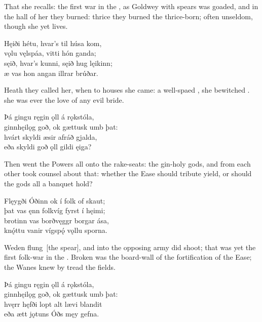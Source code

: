 \bvb That she recalls: the first war in the , as Goldwey with spears was goaded, and in the hall of \footnotemark[1] her they burned: thrice they burned the thrice-born; often unseldom, though she yet lives.\footnotemark[2]\evb
{}

\bva Hęiði hétu, \hld hvar’s til húsa kom, \\%
vǫlu vęlspáa, \hld vitti hón ganda; \\%
sęið, hvar’s kunni, \hld sęið hug lęikinn; \\%
æ vas hon angan \hld illrar brúðar.\eva

\bvb Heath they called her, when to houses she came: a well-spaed , she bewitched . she was ever the love of any evil bride.\evb

\bva Þá gingu ręgin ǫll \hld á rǫkstóla, \\%
ginnhęilǫg goð, \hld ok gættusk umb þat: \\%
hvárt skyldi æsir \hld afráð gjalda, \\%
eða skyldi goð ǫll \hld gildi ęiga?\eva

\bvb Then went the Powers all onto the rake-seats: the gin-holy gods, and from each other took counsel about that: whether the Ease should tribute yield, or should the gods all a banquet hold?\evb

\bva Flęygði Óðinn \hld ok í folk of skaut; \\%
þat vas ęnn folkvíg \hld fyrst í hęimi; \\%
brotinn vas borðvęggr \hld borgar ása, \\%
knǫ́ttu vanir vígspǫ́ \hld vǫllu sporna.\eva

\bvb Weden flung [the spear], and into the opposing army did shoot; that was yet the first folk-war in the . Broken was the board-wall of the fortification of the Ease; the Wanes knew by  tread the fields.\footnotemark[1]\evb
{}

\bva Þá gingu ręgin ǫll \hld á rǫkstóla, \\%
ginnhęilǫg goð, \hld ok gættusk umb þat: \\%
hvęrr hęfði lopt alt \hld lævi blandit \\%
eða ætt jǫtuns \hld Óðs męy gefna.\eva

